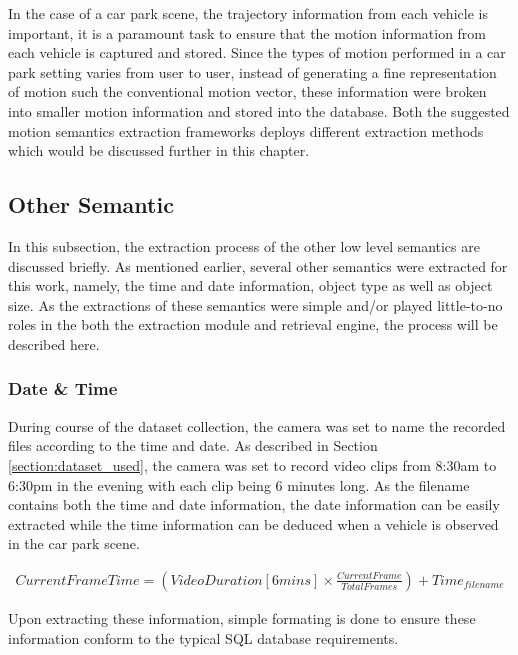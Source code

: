 In the case of a car park scene, the trajectory information from each vehicle is important, it is a paramount task to ensure that the motion information from each vehicle is captured and stored. Since the types of motion performed in a car park setting varies from user to user, instead of generating a fine representation of motion such the conventional motion vector, these information were broken into smaller motion information and stored into the database. Both the suggested motion semantics extraction frameworks deploys different extraction methods which would be discussed further in this chapter.






\subsection{Other Semantic}

In this subsection, the extraction process of the other low level semantics are discussed briefly. As mentioned earlier, several other semantics were extracted for this work, namely, the time and date information, object type as well as object size. As the extractions of these semantics were simple and/or played little-to-no roles in the both the extraction module and retrieval engine, the process will be described here.

\subsubsection{Date \& Time}
During course of the dataset collection, the camera was set to name the recorded files according to the time and date. As described in Section \ref{section:dataset_used}, the camera was set to record video clips from 8:30am to 6:30pm in the evening with each clip being 6 minutes long. As the filename contains both the time and date information, the date information can be easily extracted while the time information can be deduced when a vehicle is observed in the car park scene. 

\begin{align}
\label{eq:file_timing}
	Current Frame Time = (Video Duration [6 mins] \times \frac{Current Frame}{Total Frames}) + Time_{filename} 
\end{align}


Upon extracting these information, simple formating is done to ensure these information conform to the typical SQL database requirements.

